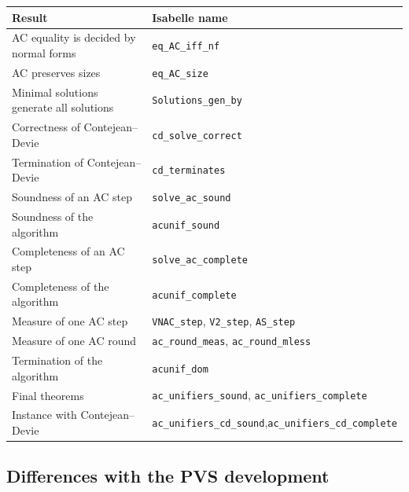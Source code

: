 \documentclass[11pt,a4paper]{article}
\theoremstyle{definition}
\theoremstyle{remark}
\newcommand{\isa}[1]{\mbox{\small\texttt{#1}}}
\begin{document}
\begin{center}
\small
\begin{tabular}{@{}p{}p{}@{}}
  \toprule
  Result & Isabelle name\\
  \midrule
  AC equality is decided by normal forms & \isa{eq\_AC\_iff\_nf}\\
  AC preserves sizes & \isa{eq\_AC\_size}\\
  Minimal solutions generate all solutions & \isa{Solutions\_gen\_by}\\
  Correctness of Contejean--Devie & \isa{cd\_solve\_correct}\\
  Termination of Contejean--Devie & \isa{cd\_terminates}\\
  Soundness of an AC step & \isa{solve\_ac\_sound}\\
  Soundness of the algorithm & \isa{acunif\_sound}\\
  Completeness of an AC step & \isa{solve\_ac\_complete}\\
  Completeness of the algorithm & \isa{acunif\_complete}\\
  Measure of one AC step & \isa{VNAC\_step}, \isa{V2\_step}, \isa{AS\_step}\\
  Measure of one AC round & \isa{ac\_round\_meas}, \isa{ac\_round\_mless}\\
  Termination of the algorithm & \isa{acunif\_dom}\\
  Final theorems & \isa{ac\_unifiers\_sound}, \isa{ac\_unifiers\_complete}\\
  Instance with Contejean--Devie & \isa{ac\_unifiers\_cd\_sound},\newline \isa{ac\_unifiers\_cd\_complete}\\
  \bottomrule
\end{tabular}
\end{center}

\subsection{Differences with the PVS development}
\end{document}
